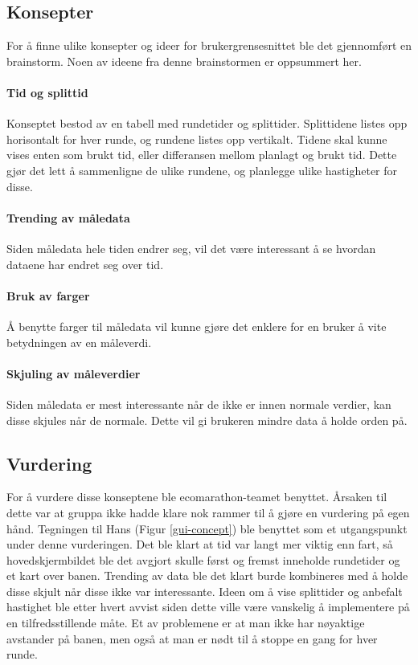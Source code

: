 \subsection{Konsepter}
For å finne ulike konsepter og ideer for brukergrensesnittet ble det gjennomført en brainstorm.
Noen av ideene fra denne brainstormen er oppsummert her.

\paragraph{Tid og splittid}
Konseptet bestod av en tabell med rundetider og splittider.
Splittidene listes opp horisontalt for hver runde, og rundene listes opp vertikalt.
Tidene skal kunne vises enten som brukt tid, eller differansen mellom planlagt og brukt tid.
Dette gjør det lett å sammenligne de ulike rundene, og planlegge ulike hastigheter for disse.

\paragraph{Trending av måledata}
Siden måledata hele tiden endrer seg, vil det være interessant å se hvordan dataene har endret seg over tid.

\paragraph{Bruk av farger}
Å benytte farger til måledata vil kunne gjøre det enklere for en bruker å vite betydningen av en måleverdi.

\paragraph{Skjuling av måleverdier}
Siden måledata er mest interessante når de ikke er innen normale verdier, kan disse skjules når de normale.
Dette vil gi brukeren mindre data å holde orden på.

\subsection{Vurdering}
For å vurdere disse konseptene ble ecomarathon-teamet benyttet.
Årsaken til dette var at gruppa ikke hadde klare nok rammer til å gjøre en vurdering på egen hånd.
Tegningen til Hans (Figur \ref{gui-concept}) ble benyttet som et utgangspunkt under denne vurderingen.
Det ble klart at tid var langt mer viktig enn fart, så hovedskjermbildet ble det avgjort skulle først og fremst inneholde rundetider og et kart over banen. 
Trending av data ble det klart burde kombineres med å holde disse skjult når disse ikke var interessante.
Ideen om å vise splittider og anbefalt hastighet ble etter hvert avvist siden dette ville være vanskelig å implementere på en tilfredsstillende måte.
Et av problemene er at man ikke har nøyaktige avstander på banen, men også at man er nødt til å stoppe en gang for hver runde.

